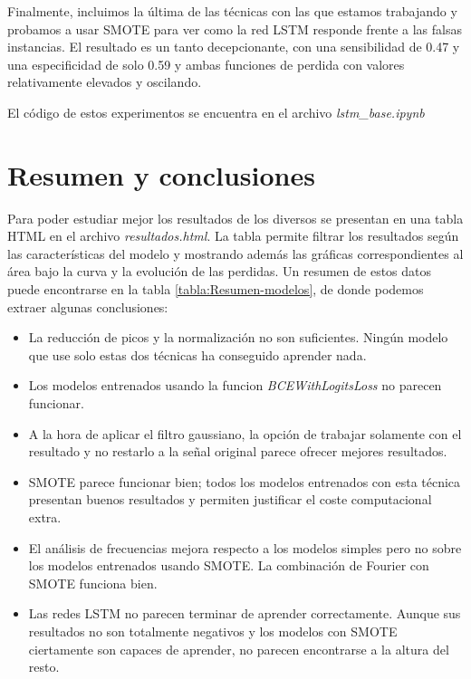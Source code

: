 Finalmente, incluimos la última de las técnicas con las que estamos trabajando y probamos a usar SMOTE para ver como la red LSTM responde frente a las falsas instancias. El resultado es un tanto decepcionante, con una sensibilidad de 0.47 y una especificidad de solo 0.59 y ambas funciones de perdida con valores relativamente elevados y oscilando. 

El código de estos experimentos se encuentra en el archivo \textit{lstm\_base.ipynb}

\section{Resumen y conclusiones}

Para poder estudiar mejor los resultados de los diversos se presentan en una tabla HTML en el archivo \textit{resultados.html}. La tabla permite filtrar los resultados según las características del modelo y mostrando además las gráficas correspondientes al área bajo la curva y la evolución de las perdidas. Un resumen de estos datos puede encontrarse en la tabla  \ref{tabla:Resumen-modelos}, de donde podemos extraer algunas conclusiones:

\begin{itemize}
    \item La reducción de picos y la normalización no son suficientes. Ningún modelo que use solo estas dos técnicas ha conseguido aprender nada.
    \item Los modelos entrenados usando la funcion \textit{BCEWithLogitsLoss} no parecen funcionar.
    \item A la hora de aplicar el filtro gaussiano, la opción de trabajar solamente con el resultado y no restarlo a la señal original parece ofrecer mejores resultados.
    \item SMOTE parece funcionar bien; todos los modelos entrenados con esta técnica presentan buenos resultados y permiten justificar el coste computacional extra.
    \item El análisis de frecuencias mejora respecto a los modelos simples pero no sobre los modelos entrenados usando SMOTE. La combinación de Fourier con SMOTE funciona bien.
    \item Las redes LSTM no parecen terminar de aprender correctamente. Aunque sus resultados no son totalmente negativos y los modelos con SMOTE ciertamente son capaces de aprender, no parecen encontrarse a la altura del resto.
\end{itemize}

